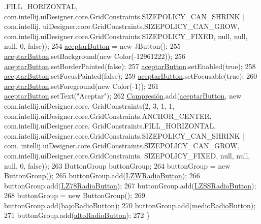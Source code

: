 \begin{DoxyCode}
      .FILL\_HORIZONTAL, com.intellij.uiDesigner.core.GridConstraints.SIZEPOLICY\_CAN\_SHRINK | com.intellij.
      uiDesigner.core.GridConstraints.SIZEPOLICY\_CAN\_GROW, com.intellij.uiDesigner.core.GridConstraints.SIZEPOLICY\_FIXED, 
      null, null, null, 0, \textcolor{keyword}{false}));
254         \hyperlink{classpresentacion_1_1form_1_1PopUp__Comp_a6321172d7f93f607a1cea6e2eee6a6ea}{aceptarButton} = \textcolor{keyword}{new} JButton();
255         \hyperlink{classpresentacion_1_1form_1_1PopUp__Comp_a6321172d7f93f607a1cea6e2eee6a6ea}{aceptarButton}.setBackground(\textcolor{keyword}{new} Color(-12961222));
256         \hyperlink{classpresentacion_1_1form_1_1PopUp__Comp_a6321172d7f93f607a1cea6e2eee6a6ea}{aceptarButton}.setBorderPainted(\textcolor{keyword}{false});
257         \hyperlink{classpresentacion_1_1form_1_1PopUp__Comp_a6321172d7f93f607a1cea6e2eee6a6ea}{aceptarButton}.setEnabled(\textcolor{keyword}{true});
258         \hyperlink{classpresentacion_1_1form_1_1PopUp__Comp_a6321172d7f93f607a1cea6e2eee6a6ea}{aceptarButton}.setFocusPainted(\textcolor{keyword}{false});
259         \hyperlink{classpresentacion_1_1form_1_1PopUp__Comp_a6321172d7f93f607a1cea6e2eee6a6ea}{aceptarButton}.setFocusable(\textcolor{keyword}{true});
260         \hyperlink{classpresentacion_1_1form_1_1PopUp__Comp_a6321172d7f93f607a1cea6e2eee6a6ea}{aceptarButton}.setForeground(\textcolor{keyword}{new} Color(-1));
261         \hyperlink{classpresentacion_1_1form_1_1PopUp__Comp_a6321172d7f93f607a1cea6e2eee6a6ea}{aceptarButton}.setText(\textcolor{stringliteral}{"Aceptar"});
262         \hyperlink{classpresentacion_1_1form_1_1PopUp__Comp_a5769b499f21466bae765c41428512966}{Compresión}.add(\hyperlink{classpresentacion_1_1form_1_1PopUp__Comp_a6321172d7f93f607a1cea6e2eee6a6ea}{aceptarButton}, \textcolor{keyword}{new} com.intellij.uiDesigner.core.
      GridConstraints(2, 3, 1, 1, com.intellij.uiDesigner.core.GridConstraints.ANCHOR\_CENTER, com.intellij.uiDesigner.core.
      GridConstraints.FILL\_HORIZONTAL, com.intellij.uiDesigner.core.GridConstraints.SIZEPOLICY\_CAN\_SHRINK | com.
      intellij.uiDesigner.core.GridConstraints.SIZEPOLICY\_CAN\_GROW, com.intellij.uiDesigner.core.GridConstraints.
      SIZEPOLICY\_FIXED, null, null, null, 0, \textcolor{keyword}{false}));
263         ButtonGroup buttonGroup;
264         buttonGroup = \textcolor{keyword}{new} ButtonGroup();
265         buttonGroup.add(\hyperlink{classpresentacion_1_1form_1_1PopUp__Comp_a810fe251f9c88e3b83ce466feafafe2e}{LZWRadioButton});
266         buttonGroup.add(\hyperlink{classpresentacion_1_1form_1_1PopUp__Comp_ac750ecbde516e2fee470693124d2ff63}{LZ78RadioButton});
267         buttonGroup.add(\hyperlink{classpresentacion_1_1form_1_1PopUp__Comp_ad18c1029f04cc43d033183dca943977c}{LZSSRadioButton});
268         buttonGroup = \textcolor{keyword}{new} ButtonGroup();
269         buttonGroup.add(\hyperlink{classpresentacion_1_1form_1_1PopUp__Comp_add9532658d448dcbfa9b7dd40ddc8b38}{bajoRadioButton});
270         buttonGroup.add(\hyperlink{classpresentacion_1_1form_1_1PopUp__Comp_ad1daa09264648f37642b24a698e32206}{medioRadioButton});
271         buttonGroup.add(\hyperlink{classpresentacion_1_1form_1_1PopUp__Comp_a9f49f4c6ce6d4f60a7015d8699aef151}{altoRadioButton});
272     \}
\end{DoxyCode}
